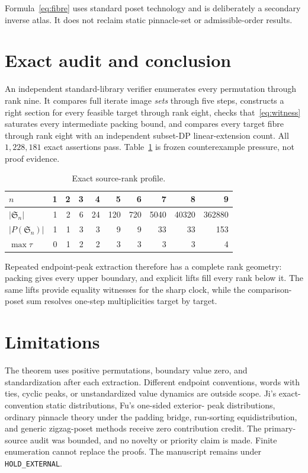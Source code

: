 \documentclass[a4paper,10pt]{amsart}
\theoremstyle{definition}
\theoremstyle{remark}
\newcommand{\Sn}{\mathfrak S}
\begin{document}
Formula~\eqref{eq:fibre} uses standard poset technology and is deliberately a
secondary inverse atlas.  It does not reclaim static pinnacle-set or
admissible-order results.

\section{Exact audit and conclusion}

An independent standard-library verifier enumerates every permutation through
rank nine.  It compares full iterate image \emph{sets} through five steps,
constructs a right section for every feasible target through rank eight,
checks that~\eqref{eq:witness} saturates every intermediate packing bound, and
compares every target fibre through rank eight with an independent subset-DP
linear-extension count.  All $1{,}228{,}181$ exact assertions pass.
Table~\ref{tab:audit} is frozen counterexample pressure, not proof evidence.

\begin{table}[ht]
\centering
\small
\caption{Exact source-rank profile.}
\label{tab:audit}
\begin{tabular}{@{}l*{9}{r}@{}}
\toprule
$n$&1&2&3&4&5&6&7&8&9\\
\midrule
$|\Sn_n|$&1&2&6&24&120&720&5040&40320&362880\\
$|P(\Sn_n)|$&1&1&3&3&9&9&33&33&153\\
$\max\tau$&0&1&2&2&3&3&3&3&4\\
\bottomrule
\end{tabular}
\end{table}

Repeated endpoint-peak extraction therefore has a complete rank geometry:
packing gives every upper boundary, and explicit lifts fill every rank below
it.  The same lifts provide equality witnesses for the sharp clock, while the
comparison-poset sum resolves one-step multiplicities target by target.

\section*{Limitations}
The theorem uses positive permutations, boundary value zero, and
standardization after each extraction.  Different endpoint conventions,
words with ties, cyclic peaks, or unstandardized value dynamics are outside
scope.  Ji's exact-convention static distributions, Fu's one-sided exterior-
peak distributions, ordinary pinnacle theory under the padding bridge,
run-sorting equidistribution, and generic
zigzag-poset methods receive zero contribution credit.  The primary-source
audit was bounded, and no novelty or priority claim is made.  Finite
enumeration cannot replace the proofs.  The manuscript remains under
\texttt{HOLD\_EXTERNAL}.
\end{document}
